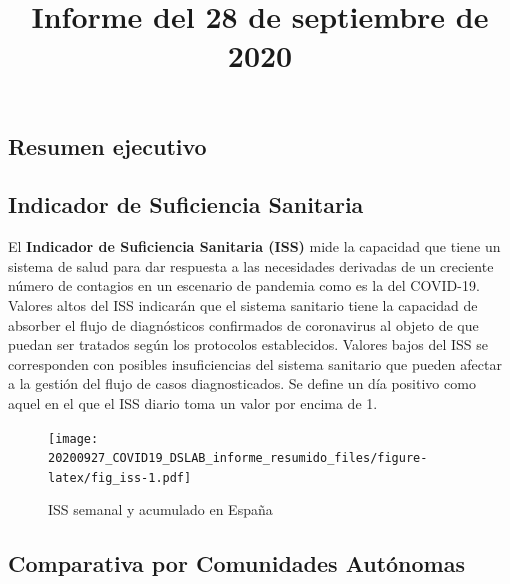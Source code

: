 \documentclass[
  11pt,
]{article}
\title{Informe del 28 de septiembre de 2020}
\author{}
\date{\vspace{-2.5em}}
\begin{document}
\maketitle

\renewcommand{\figurename}{Figura}
\renewcommand{\tablename}{Tabla}

\vspace{-0.5cm}

\hypertarget{resumen-ejecutivo}{%
\subsection{Resumen ejecutivo}\label{resumen-ejecutivo}}

\hypertarget{indicador-de-suficiencia-sanitaria}{%
\subsection{Indicador de Suficiencia
Sanitaria}\label{indicador-de-suficiencia-sanitaria}}

El \textbf{Indicador de Suficiencia Sanitaria (ISS)} mide la capacidad
que tiene un sistema de salud para dar respuesta a las necesidades
derivadas de un creciente número de contagios en un escenario de
pandemia como es la del COVID-19. Valores altos del ISS indicarán que el
sistema sanitario tiene la capacidad de absorber el flujo de
diagnósticos confirmados de coronavirus al objeto de que puedan ser
tratados según los protocolos establecidos. Valores bajos del ISS se
corresponden con posibles insuficiencias del sistema sanitario que
pueden afectar a la gestión del flujo de casos diagnosticados. Se define
un día positivo como aquel en el que el ISS diario toma un valor por
encima de 1.

\vspace{0.2cm}

\begin{figure}
\centering
\texttt{[image: 20200927\_COVID19\_DSLAB\_informe\_resumido\_files/figure-latex/fig\_iss-1.pdf]}
\caption{\label{fig:fig_iss} ISS semanal y acumulado en España}
\end{figure}

\clearpage

\hypertarget{comparativa-por-comunidades-autuxf3nomas}{%
\subsection{Comparativa por Comunidades
Autónomas}\label{comparativa-por-comunidades-autuxf3nomas}}
\end{document}
